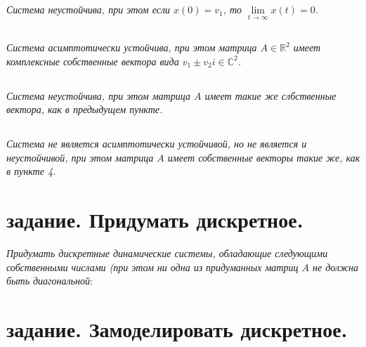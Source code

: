 \documentclass[a5paper, 10pt]{article}
\theoremstyle{definition}
\theoremstyle{plain}
\theoremstyle{remark}
\begin{document}
\subsection{}
\textit{Система неустойчива, при этом если $x(0) = v_1$, то $\lim\limits_{t \to \infty} x(t) = 0$.}


\subsection{}
\textit{Система асимптотически устойчива, при этом матрица $A \in \mathbb{R}^2$ имеет комплексные собственные вектора вида $v_1 \pm v_2 i \in \mathbb{C}^2$.}


\subsection{}
\textit{Система неустойчива, при этом матрица $A$ имеет такие же слбственные вектора, как в предыдущем пункте.}



\subsection{}
\textit{Система не является асимптотически устойчивой, но не является и неустойчивой, при этом матрица $A$ имеет собственные векторы такие же, как в пункте 4.}




\newpage
\section{задание. Придумать дискретное.}
\textit{Придумать дискретные динамические системы, обладающие следующими собственными числами (при этом ни одна из придуманных матриц $A$ не должна быть диагональной}:






\newpage
\section{задание. Замоделировать дискретное.}
\end{document}
